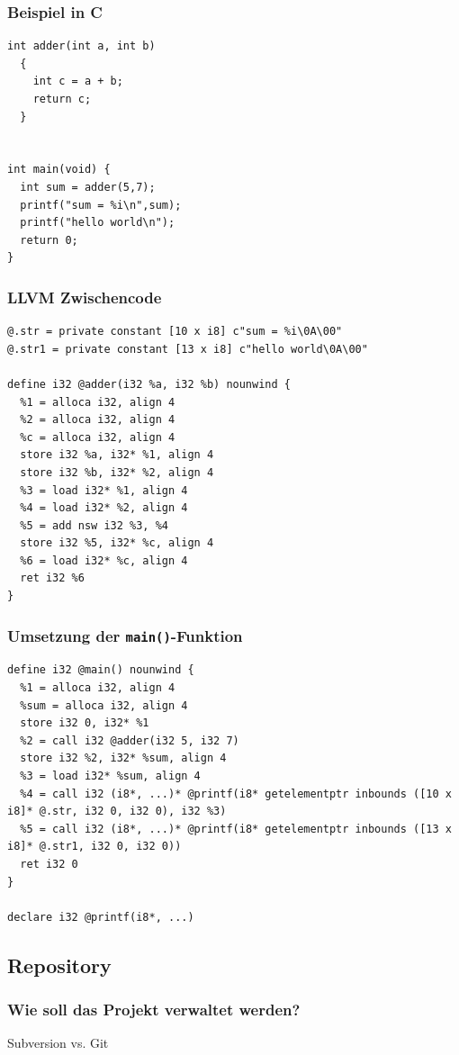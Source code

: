 \documentclass[ucs,9pt]{beamer}
\begin{document}
\begin{frame}[fragile]
  \frametitle{Beispiel in C}
  \begin{verbatim}
int adder(int a, int b)
  {
    int c = a + b;
    return c;
  }


int main(void) {
  int sum = adder(5,7);
  printf("sum = %i\n",sum);
  printf("hello world\n");
  return 0;
}
  \end{verbatim}
\end{frame}

\begin{frame}[fragile]
  \frametitle{LLVM Zwischencode}
  \begin{verbatim}
@.str = private constant [10 x i8] c"sum = %i\0A\00"
@.str1 = private constant [13 x i8] c"hello world\0A\00"

define i32 @adder(i32 %a, i32 %b) nounwind {
  %1 = alloca i32, align 4
  %2 = alloca i32, align 4
  %c = alloca i32, align 4
  store i32 %a, i32* %1, align 4
  store i32 %b, i32* %2, align 4
  %3 = load i32* %1, align 4
  %4 = load i32* %2, align 4
  %5 = add nsw i32 %3, %4
  store i32 %5, i32* %c, align 4
  %6 = load i32* %c, align 4
  ret i32 %6
}
  \end{verbatim}
\end{frame}

\begin{frame}[fragile]
  \frametitle{Umsetzung der \texttt{main()}-Funktion}
  \begin{verbatim}
define i32 @main() nounwind {
  %1 = alloca i32, align 4
  %sum = alloca i32, align 4
  store i32 0, i32* %1
  %2 = call i32 @adder(i32 5, i32 7)
  store i32 %2, i32* %sum, align 4
  %3 = load i32* %sum, align 4
  %4 = call i32 (i8*, ...)* @printf(i8* getelementptr inbounds ([10 x i8]* @.str, i32 0, i32 0), i32 %3)
  %5 = call i32 (i8*, ...)* @printf(i8* getelementptr inbounds ([13 x i8]* @.str1, i32 0, i32 0))
  ret i32 0
}

declare i32 @printf(i8*, ...)
  \end{verbatim}
\end{frame}

\subsection{Repository}
\begin{frame}
  \frametitle{Wie soll das Projekt verwaltet werden?}
  \begin{center}
    \Huge Subversion vs. Git
  \end{center}
\end{frame}
\end{document}
